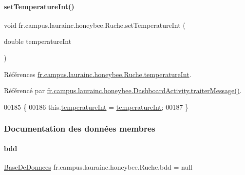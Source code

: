 \paragraph{\texorpdfstring{set\+Temperature\+Int()}{setTemperatureInt()}}
{\footnotesize\ttfamily void fr.\+campus.\+laurainc.\+honeybee.\+Ruche.\+set\+Temperature\+Int (\begin{DoxyParamCaption}\item[{double}]{temperature\+Int }\end{DoxyParamCaption})}



Références \hyperlink{classfr_1_1campus_1_1laurainc_1_1honeybee_1_1_ruche_aa8c8bbb640a5e445ca1d67f97e0f99b0}{fr.\+campus.\+laurainc.\+honeybee.\+Ruche.\+temperature\+Int}.



Référencé par \hyperlink{classfr_1_1campus_1_1laurainc_1_1honeybee_1_1_dashboard_activity_a50d4c14e993ff1779ae5dce8cee11216}{fr.\+campus.\+laurainc.\+honeybee.\+Dashboard\+Activity.\+traiter\+Message()}.


\begin{DoxyCode}
00185                                                          \{
00186         this.\hyperlink{classfr_1_1campus_1_1laurainc_1_1honeybee_1_1_ruche_aa8c8bbb640a5e445ca1d67f97e0f99b0}{temperatureInt} = \hyperlink{classfr_1_1campus_1_1laurainc_1_1honeybee_1_1_ruche_aa8c8bbb640a5e445ca1d67f97e0f99b0}{temperatureInt};
00187     \}
\end{DoxyCode}


\subsubsection{Documentation des données membres}
\mbox{\label{classfr_1_1campus_1_1laurainc_1_1honeybee_1_1_ruche_a0eb43a2b63fb83e9d5af6cd6b754c7da}} 
\paragraph{\texorpdfstring{bdd}{bdd}}
{\footnotesize\ttfamily \hyperlink{classfr_1_1campus_1_1laurainc_1_1honeybee_1_1_base_de_donnees}{Base\+De\+Donnees} fr.\+campus.\+laurainc.\+honeybee.\+Ruche.\+bdd = null\hspace{0.3cm}{\ttfamily [private]}}

